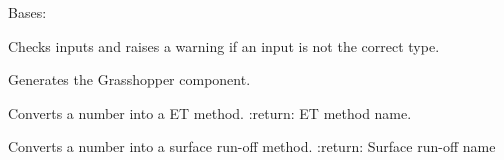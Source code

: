 \documentclass[letterpaper,10pt,english]{sphinxmanual}
\begin{document}
\begin{fulllineitems}
\label{\detokenize{cmf:livestock.components.comp_cmf.CMFGround}}
Bases: {\hyperref[\detokenize{superclass:livestock.components.component.GHComponent}]{}}

\begin{fulllineitems}
\label{\detokenize{cmf:livestock.components.comp_cmf.CMFGround.check_inputs}}
Checks inputs and raises a warning if an input is not the correct type.

\end{fulllineitems}


\begin{fulllineitems}
\label{\detokenize{cmf:livestock.components.comp_cmf.CMFGround.config}}
Generates the Grasshopper component.

\end{fulllineitems}


\begin{fulllineitems}
\label{\detokenize{cmf:livestock.components.comp_cmf.CMFGround.convert_et_number_to_method}}
Converts a number into a ET method.
:return: ET method name.

\end{fulllineitems}


\begin{fulllineitems}
\label{\detokenize{cmf:livestock.components.comp_cmf.CMFGround.convert_runoff_number_to_method}}
Converts a number into a surface run-off method.
:return: Surface run-off name

\end{fulllineitems}


\end{fulllineitems}
\end{document}
